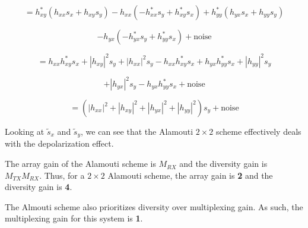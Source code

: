 \documentclass[fleqn]{article}
\begin{document}
\begin{enumerate}
		\begin{equation*}
			= h_{xy}^*(h_{xx}s_x + h_{xy}s_y) - h_{xx}(-h_{xx}^*s_y + h_{xy}^*s_x) + h_{yy}^*(h_{yx}s_x + h_{yy}s_y)
		\end{equation*}
		
		\begin{equation*}
			- h_{yx}(-h_{yx}^*s_y + h_{yy}^*s_x) + \text{noise}
		\end{equation*}
		
		\begin{equation*}
			= h_{xx}h_{xy}^*s_x + |h_{xy}|^2s_y + |h_{xx}|^2s_y - h_{xx}h_{xy}^*s_x + h_{yx}h_{yy}^*s_x + |h_{yy}|^2s_y
		\end{equation*}
		
		\begin{equation*}
			+ |h_{yx}|^2s_y - h_{yx}h_{yy}^*s_x + \text{noise}
		\end{equation*}
		
		\begin{equation*}
			= (|h_{xx}|^2 + |h_{xy}|^2 + |h_{yx}|^2 + |h_{yy}|^2)s_y + \text{noise}
		\end{equation*}
		
		Looking at $\tilde{s}_x$ and $\tilde{s}_y$, we can see that the Alamouti $2\times 2$ scheme effectively deals with the depolarization effect.
		
		\pagebreak
		
%		
%		
		
		The array gain of the Alamouti scheme is $M_{RX}$ and the diversity gain is $M_{TX}M_{RX}$. Thus, for a $2 \times 2$ Alamouti scheme, the array gain is \textbf{2} and the diversity gain is \textbf{4}.

		The Almouti scheme also prioritizes diversity over multiplexing gain. As such, the multiplexing gain for this system is \textbf{1}.
		
%		
		

\end{enumerate}
\end{document}
